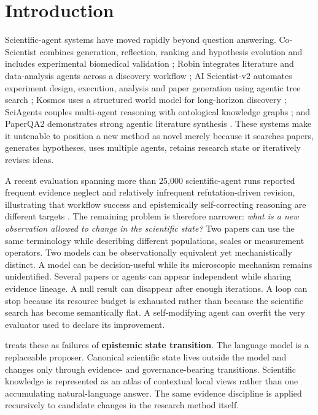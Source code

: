 \section{Introduction}
Scientific-agent systems have moved rapidly beyond question answering. Co-Scientist combines generation, reflection, ranking and hypothesis evolution and includes experimental biomedical validation \cite{gottweis2026}; Robin integrates literature and data-analysis agents across a discovery workflow \cite{ghareeb2026}; AI Scientist-v2 automates experiment design, execution, analysis and paper generation using agentic tree search \cite{yamada2025}; Kosmos uses a structured world model for long-horizon discovery \cite{mitchener2025}; SciAgents couples multi-agent reasoning with ontological knowledge graphs \cite{ghafarollahi2024}; and PaperQA2 demonstrates strong agentic literature synthesis \cite{skarlinski2024}. These systems make it untenable to position a new method as novel merely because it searches papers, generates hypotheses, uses multiple agents, retains research state or iteratively revises ideas.

A recent evaluation spanning more than 25,000 scientific-agent runs reported frequent evidence neglect and relatively infrequent refutation-driven revision, illustrating that workflow success and epistemically self-correcting reasoning are different targets \cite{riosgarcia2026}. The remaining problem is therefore narrower: \emph{what is a new observation allowed to change in the scientific state?} Two papers can use the same terminology while describing different populations, scales or measurement operators. Two models can be observationally equivalent yet mechanistically distinct. A model can be decision-useful while its microscopic mechanism remains unidentified. Several papers or agents can appear independent while sharing evidence lineage. A null result can disappear after enough iterations. A loop can stop because its resource budget is exhausted rather than because the scientific search has become semantically flat. A self-modifying agent can overfit the very evaluator used to declare its improvement.

\RAKL{} treats these as failures of \textbf{epistemic state transition}. The language model is a replaceable proposer. Canonical scientific state lives outside the model and changes only through evidence- and governance-bearing transitions. Scientific knowledge is represented as an atlas of contextual local views rather than one accumulating natural-language answer. The same evidence discipline is applied recursively to candidate changes in the research method itself.


